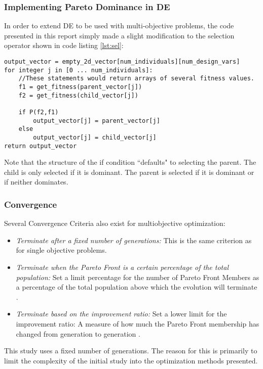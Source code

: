 \subsubsection{Implementing Pareto Dominance in DE}

In order to extend DE to be used with multi-objective problems, the code presented in this report simply made a slight modification to the selection operator shown in code listing \ref{lst:sel}:

\begin{lstlisting}[label=lst:modsel,caption=Modified Selection Operator,captionpos=b]
output_vector = empty_2d_vector[num_individuals][num_design_vars]
for integer j in [0 ... num_individuals]:
    //These statements would return arrays of several fitness values. 
    f1 = get_fitness(parent_vector[j])
    f2 = get_fitness(child_vector[j])

    if P(f2,f1)
        output_vector[j] = parent_vector[j]
    else
        output_vector[j] = child_vector[j]
return output_vector
\end{lstlisting}
Note that the structure of the if condition ``defaults" to selecting the parent. The child is only selected if it is dominant. The parent is selected if it is dominant or if neither dominates. 

\subsubsection{Convergence}
Several Convergence Criteria also exist for multiobjective optimization:

\begin{itemize}
\item \emph{Terminate after a fixed number of generations:} This is the same criterion as for single objective problems. 
\item \emph{Terminate when the Pareto Front is a certain percentage of the total population:} Set a limit percentage for the number of Pareto Front Members as a percentage of the total population above which the evolution will terminate \cite{mogaconv}.
\item \emph{Terminate based on the improvement ratio:} Set a lower limit for the improvement ratio: A measure of how much the Pareto Front membership has changed from generation to generation \cite{mdconv}.
\end{itemize}

This study uses a fixed number of generations. The reason for this is primarily to limit the complexity of the initial study into the optimization methods presented.
